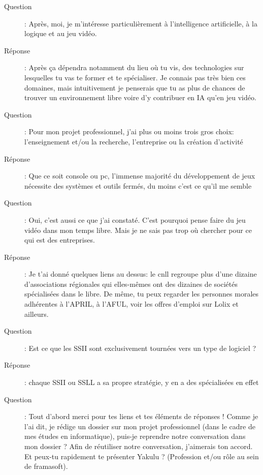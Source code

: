 \documentclass[a4paper,12pt, draft]{report}
\begin{document}
\begin{description}
\item [Question]:  Après, moi, je m'intéresse particulièrement à l'intelligence artificielle, à la logique et au jeu vidéo.
\item [Réponse]:  Après ça dépendra notamment du lieu où tu vis, des technologies sur lesquelles tu vas te former et te spécialiser. Je connais pas très bien ces domaines, mais intuitivement je penserais que tu as plus de chances de trouver un environnement libre voire d'y contribuer en IA qu'en jeu vidéo.
\item [Question]:  Pour mon projet professionnel, j'ai plus ou moins trois gros choix: l'enseignement et/ou la recherche, l'entreprise ou la création d'activité 
\item [Réponse]:  Que ce soit console ou pc, l'immense majorité du développement de jeux nécessite des systèmes et outils fermés, du moins c'est ce qu'il me semble
\item [Question]:  Oui, c'est aussi ce que j'ai constaté. C'est pourquoi pense faire du jeu vidéo dans mon temps libre. Mais je ne sais pas trop où chercher pour ce qui est des entreprises.
\item [Réponse]:  Je t'ai donné quelques liens au dessus: le cnll regroupe plus d'une dizaine d'associations régionales qui elles-mêmes ont des dizaines de sociétés spécialisées dans le libre. De même, tu peux regarder les personnes morales adhérentes à l'APRIL, à l'AFUL, voir les offres d'emploi sur Lolix et ailleurs.

\item [Question]:  Est ce que les SSII sont exclusivement tournées vers un type de logiciel ?
\item [Réponse]:  chaque SSII ou SSLL a sa propre stratégie, y en a des spécialisées en effet
\item [Question]: Tout d'abord merci pour tes liens et tes éléments de réponses ! Comme je l'ai dit, je rédige un dossier sur mon projet professionnel (dans le cadre de mes études en informatique), puis-je reprendre notre conversation dans mon dossier ?  Afin de réutiliser notre conversation, j'aimerais ton accord. Et peux-tu rapidement te présenter Yakulu ? (Profession et/ou rôle au sein de framasoft).


\end{description}
\end{document}
